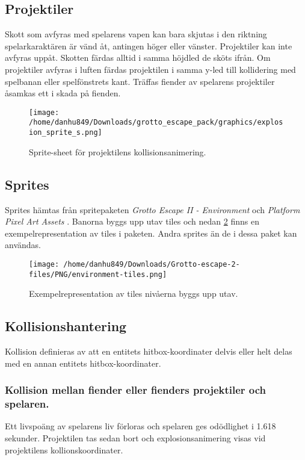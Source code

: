\documentclass{TDP005mall}
\begin{document}
\subsection{Projektiler}
Skott som avfyras med spelarens vapen kan bara skjutas i den riktning spelarkaraktären är vänd åt, antingen höger eller vänster. Projektiler kan inte avfyras uppåt. Skotten färdas alltid i samma höjdled de sköts ifrån. Om projektiler avfyras i luften färdas projektilen i samma y-led till kollidering med spelbanan eller spelfönstrets kant. Träffas fiender av spelarens projektiler åsamkas ett i skada på fienden.

\begin{figure}[h!]
  \texttt{[image: /home/danhu849/Downloads/grotto\_escape\_pack/graphics/explosion\_sprite\_s.png]}
  \caption{Sprite-sheet för projektilens kollisionsanimering.\label{fig:6}}
\end{figure}

\subsection{Sprites}
Sprites hämtas från spritepaketen \emph{Grotto Escape II - Environment} \textcite{grotto2} och \emph{Platform Pixel Art Assets} \textcite{grotto1}. Banorna byggs upp utav tiles och nedan \ref{fig:a} finns en exempelrepresentation av tiles i paketen. Andra sprites än de i dessa paket kan användas.

\begin{figure}[h!]
  \texttt{[image: /home/danhu849/Downloads/Grotto-escape-2-files/PNG/environment-tiles.png]}
  \caption{Exempelrepresentation av tiles nivåerna byggs upp utav.\label{fig:a}}
\end{figure}

\subsection{Kollisionshantering} %
Kollision definieras av att en entitets hitbox-koordinater delvis eller helt delas med en annan entitets hitbox-koordinater.
\subsubsection*{Kollision mellan fiender eller fienders projektiler och spelaren.\label{section:1}}
Ett livspoäng av spelarens liv förloras och spelaren ges odödlighet i 1.618 sekunder. Projektilen tas sedan bort och explosionsanimering visas vid projektilens kollionskoordinater.
\end{document}

